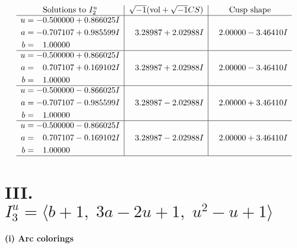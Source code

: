\documentclass[1p]{elsarticle_modified}
\theoremstyle{definition}
\newcommand{\I}{\sqrt{-1}}
\begin{document}
$$\begin{array}{c|c|c}  
\text{Solutions to }I^u_{2}& \I (\text{vol} + \sqrt{-1}CS) & \text{Cusp shape}\\
 \hline 
\begin{aligned}
u &= -0.500000 + 0.866025 I \\
a &= -0.707107 + 0.985599 I \\
b &= \phantom{-}1.00000\phantom{ +0.000000I}\end{aligned}
 & \phantom{-}3.28987 + 2.02988 I & \phantom{-}2.00000 - 3.46410 I \\ \hline\begin{aligned}
u &= -0.500000 + 0.866025 I \\
a &= \phantom{-}0.707107 + 0.169102 I \\
b &= \phantom{-}1.00000\phantom{ +0.000000I}\end{aligned}
 & \phantom{-}3.28987 + 2.02988 I & \phantom{-}2.00000 - 3.46410 I \\ \hline\begin{aligned}
u &= -0.500000 - 0.866025 I \\
a &= -0.707107 - 0.985599 I \\
b &= \phantom{-}1.00000\phantom{ +0.000000I}\end{aligned}
 & \phantom{-}3.28987 - 2.02988 I & \phantom{-}2.00000 + 3.46410 I \\ \hline\begin{aligned}
u &= -0.500000 - 0.866025 I \\
a &= \phantom{-}0.707107 - 0.169102 I \\
b &= \phantom{-}1.00000\phantom{ +0.000000I}\end{aligned}
 & \phantom{-}3.28987 - 2.02988 I & \phantom{-}2.00000 + 3.46410 I\\
 \hline 
 \end{array}$$\newpage\newpage\renewcommand{\arraystretch}{1}
\centering \section*{III. $I^u_{3}= \langle b+1,\;3 a-2 u+1,\;u^2- u+1 \rangle$}
\flushleft \textbf{(i) Arc colorings}\\
\end{document}
